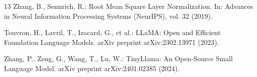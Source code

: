\documentclass[runningheads,oribibl]{llncs}
\begin{document}
\begin{thebibliography}{13}
Zhang, B., Sennrich, R.: Root Mean Square Layer Normalization. In: Advances in Neural Information Processing Systems (NeurIPS), vol. 32 (2019).

Touvron, H., Lavril, T., Izacard, G., et al.: LLaMA: Open and Efficient Foundation Language Models. arXiv preprint arXiv:2302.13971 (2023).

Zhang, P., Zeng, G., Wang, T., Lu, W.: TinyLlama: An Open-Source Small Language Model. arXiv preprint arXiv:2401.02385 (2024).
\end{thebibliography}
\end{document}
